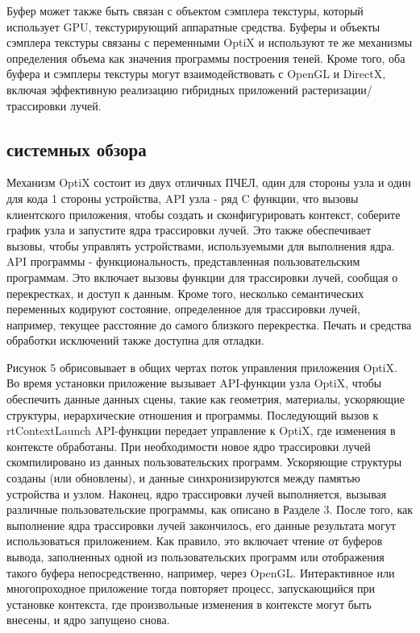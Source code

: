 Буфер может также быть связан с объектом сэмплера текстуры, который использует GPU, текстурирующий аппаратные средства. Буферы и объекты сэмплера текстуры связаны с переменными OptiX и используют те же механизмы определения объема как значения программы построения теней. Кроме того, оба буфера и сэмплеры текстуры могут взаимодействовать с OpenGL и DirectX, включая эффективную реализацию гибридных приложений растеризации/трассировки лучей.
\subsection{системных обзора}
Механизм OptiX состоит из двух отличных ПЧЕЛ, один для стороны узла и один для кода 1 стороны устройства, API узла - ряд C функции, что вызовы клиентского приложения, чтобы создать и сконфигурировать контекст, соберите график узла и запустите ядра трассировки лучей. Это также обеспечивает вызовы, чтобы управлять устройствами, используемыми для выполнения ядра. API программы - функциональность, представленная пользовательским программам. Это включает вызовы функции для трассировки лучей, сообщая о перекрестках, и доступ к данным. Кроме того, несколько семантических переменных кодируют состояние, определенное для трассировки лучей, например, текущее расстояние до самого близкого перекрестка.
Печать и средства обработки исключений также доступна для отладки.

Рисунок 5 обрисовывает в общих чертах поток управления приложения OptiX. Во время установки приложение вызывает API-функции узла OptiX, чтобы обеспечить данные данных сцены, такие как геометрия, материалы, ускоряющие структуры, иерархические отношения и программы. Последующий вызов к rtContextLaunch API-функции передает управление к OptiX, где изменения в контексте обработаны. При необходимости новое ядро трассировки лучей скомпилировано из данных пользовательских программ. Ускоряющие структуры созданы (или обновлены), и данные синхронизируются между памятью устройства и узлом. Наконец, ядро трассировки лучей выполняется, вызывая различные пользовательские программы, как описано в Разделе 3. После того, как выполнение ядра трассировки лучей закончилось, его данные результата могут использоваться приложением. Как правило, это включает чтение от буферов вывода, заполненных одной из пользовательских программ или отображения такого буфера непосредственно, например, через OpenGL. Интерактивное или многопроходное приложение тогда повторяет процесс, запускающийся при установке контекста, где произвольные изменения в контексте могут быть внесены, и ядро запущено снова.
